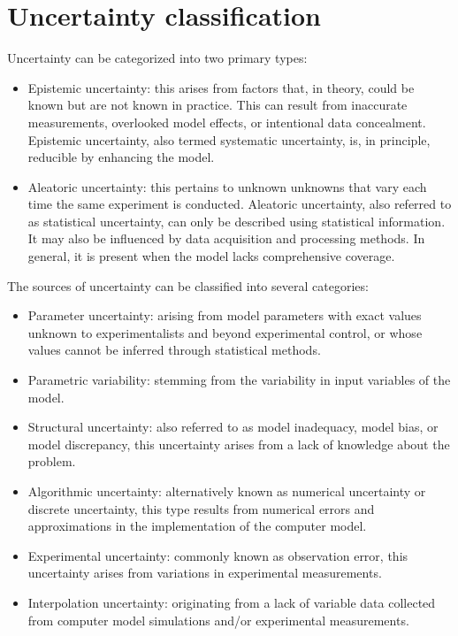 \documentclass[12pt, a4paper]{report}
\begin{document}
    \section{Uncertainty classification}
    Uncertainty can be categorized into two primary types:
    \begin{itemize}
        \item Epistemic uncertainty: this arises from factors that, in theory, could be known but are not known in practice. 
            This can result from inaccurate measurements, overlooked model effects, or intentional data concealment. 
            Epistemic uncertainty, also termed systematic uncertainty, is, in principle, reducible by enhancing the model.   
        \item Aleatoric uncertainty: this pertains to unknown unknowns that vary each time the same experiment is conducted. 
            Aleatoric uncertainty, also referred to as statistical uncertainty, can only be described using statistical information. 
            It may also be influenced by data acquisition and processing methods. 
            In general, it is present when the model lacks comprehensive coverage.
    \end{itemize}
    The sources of uncertainty can be classified into several categories:
    \begin{itemize}
        \item Parameter uncertainty: arising from model parameters with exact values unknown to experimentalists and beyond experimental control, or whose values cannot be inferred through statistical methods.
        \item Parametric variability: stemming from the variability in input variables of the model. 
        \item Structural uncertainty: also referred to as model inadequacy, model bias, or model discrepancy, this uncertainty arises from a lack of knowledge about the problem.
        \item Algorithmic uncertainty: alternatively known as numerical uncertainty or discrete uncertainty, this type results from numerical errors and approximations in the implementation of the computer model.
        \item Experimental uncertainty: commonly known as observation error, this uncertainty arises from variations in experimental measurements.
        \item Interpolation uncertainty: originating from a lack of variable data collected from computer model simulations and/or experimental measurements.
    \end{itemize}
\end{document}
